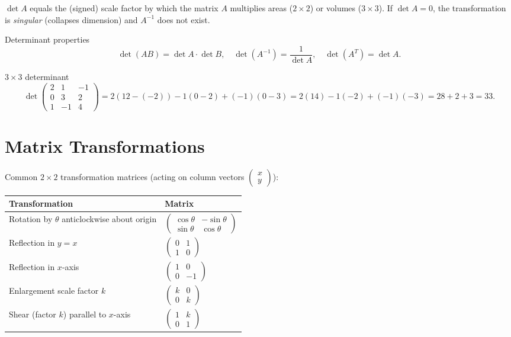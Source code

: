 \documentclass[12pt,a4paper]{article}
\theoremstyle{defstyle}
\begin{document}
\(\det A\) equals the (signed) scale factor by which the matrix \(A\) multiplies areas (\(2\times2\)) or volumes (\(3\times3\)).  If \(\det A=0\), the transformation is \emph{singular} (collapses dimension) and \(A^{-1}\) does not exist.

\begin{result}{Determinant properties}{}
\[
  \det(AB)=\det A\cdot\det B,\quad \det(A^{-1})=\frac{1}{\det A},\quad \det(A^T)=\det A.
\]
\end{result}

\begin{example}{$3\times3$ determinant}{}
\[
  \det\begin{pmatrix}2&1&-1\\0&3&2\\1&-1&4\end{pmatrix}
  = 2(12-(-2))-1(0-2)+(-1)(0-3) = 2(14)-1(-2)+(-1)(-3)=28+2+3=33.
\]
\end{example}

\section{Matrix Transformations}

Common \(2\times2\) transformation matrices (acting on column vectors \(\begin{pmatrix}x\\y\end{pmatrix}\)):

\begin{result}{}{}
\renewcommand{\arraystretch}{1.6}
\begin{center}
\begin{tabular}{ll}
\toprule
Transformation & Matrix \\
\midrule
Rotation by \(\theta\) anticlockwise about origin
  & $\begin{pmatrix}\cos\theta & -\sin\theta\\ \sin\theta & \cos\theta\end{pmatrix}$ \\[6pt]
Reflection in \(y=x\)
  & $\begin{pmatrix}0&1\\1&0\end{pmatrix}$ \\[6pt]
Reflection in \(x\)-axis
  & $\begin{pmatrix}1&0\\0&-1\end{pmatrix}$ \\[6pt]
Enlargement scale factor \(k\)
  & $\begin{pmatrix}k&0\\0&k\end{pmatrix}$ \\[6pt]
Shear (factor \(k\)) parallel to \(x\)-axis
  & $\begin{pmatrix}1&k\\0&1\end{pmatrix}$ \\
\bottomrule
\end{tabular}
\end{center}
\end{result}
\end{document}
